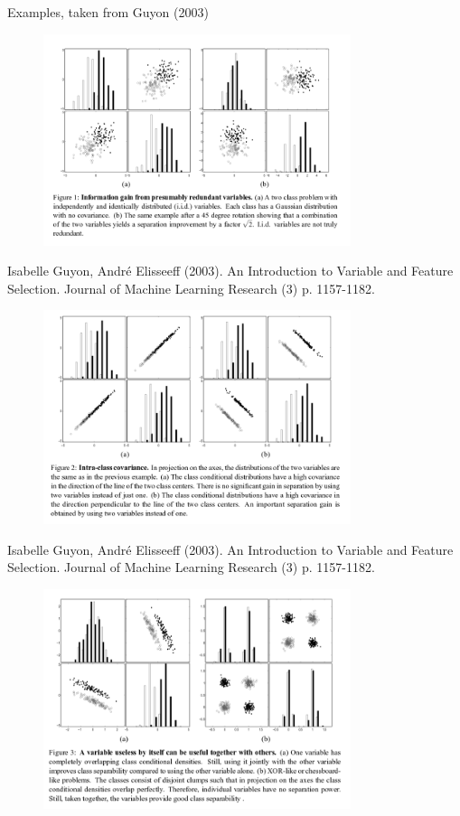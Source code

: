 \documentclass[11pt,compress,t,notes=noshow, xcolor=table]{beamer}
\begin{document}
  \begin{vbframe}{Examples, taken from Guyon (2003)}

  \begin{figure}
    \includegraphics[width=9cm]{figure_man/varsel_ex0.png}
  \end{figure}

  \begin{center}
  \footnotesize{Isabelle Guyon, André Elisseeff (2003). An Introduction to Variable and Feature Selection.  Journal of Machine Learning Research (3) p. 1157-1182.}
  \end{center}

  \framebreak

  \begin{figure}
    \includegraphics[width=9cm]{figure_man/varsel_ex1.png}
  \end{figure}

  \begin{center}
  \footnotesize{Isabelle Guyon, André Elisseeff (2003). An Introduction to Variable and Feature Selection.  Journal of Machine Learning Research (3) p. 1157-1182.}
  \end{center}

  \framebreak

  \begin{figure}
    \includegraphics[width=9cm]{figure_man/varsel_ex2.png}
  \end{figure}


\end{vbframe}
\end{document}
